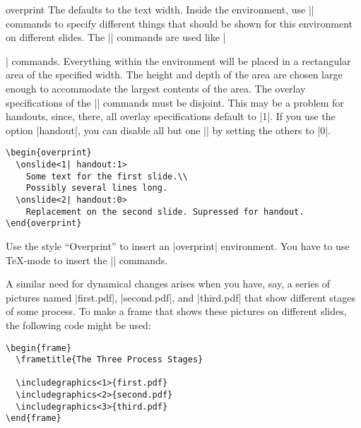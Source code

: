 \begin{environment}{{overprint}}
  The  defaults to the text width. Inside the environment, use |\onslide| commands to specify different things that should be shown for this environment on different slides. The |\onslide| commands are used like |\item| commands. Everything within the environment will be placed in a rectangular area of the specified width. The height and depth of the area are chosen large enough to accommodate the largest contents of the area. The overlay specifications of the |\onslide| commands must be disjoint. This may be a problem for handouts, since, there, all overlay specifications default to |1|. If you use the option |handout|, you can disable all but one |\onslide| by setting the others to |0|.

  \example
\begin{verbatim}
\begin{overprint}
  \onslide<1| handout:1>
    Some text for the first slide.\\
    Possibly several lines long.
  \onslide<2| handout:0>
    Replacement on the second slide. Supressed for handout.
\end{overprint}
\end{verbatim}

  \lyxnote
  Use the style ``Overprint'' to insert an |overprint| environment. You have to use \TeX-mode to insert the |\onslide| commands.
\end{environment}

A similar need for dynamical changes arises when you have, say, a series of pictures named |first.pdf|, |second.pdf|, and |third.pdf| that show different stages of some process. To make a frame that shows these pictures on different slides, the following code might be used:
\begin{verbatim}
\begin{frame}
  \frametitle{The Three Process Stages}

  \includegraphics<1>{first.pdf}
  \includegraphics<2>{second.pdf}
  \includegraphics<3>{third.pdf}
\end{frame}
\end{verbatim}

